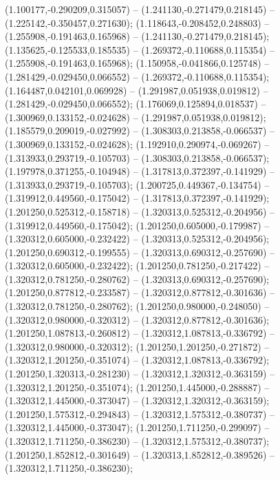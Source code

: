  (1.100177,-0.290209,0.315057) -- (1.241130,-0.271479,0.218145) -- (1.225142,-0.350457,0.271630);
 (1.118643,-0.208452,0.248803) -- (1.255908,-0.191463,0.165968) -- (1.241130,-0.271479,0.218145);
 (1.135625,-0.125533,0.185535) -- (1.269372,-0.110688,0.115354) -- (1.255908,-0.191463,0.165968);
 (1.150958,-0.041866,0.125748) -- (1.281429,-0.029450,0.066552) -- (1.269372,-0.110688,0.115354);
 (1.164487,0.042101,0.069928) -- (1.291987,0.051938,0.019812) -- (1.281429,-0.029450,0.066552);
 (1.176069,0.125894,0.018537) -- (1.300969,0.133152,-0.024628) -- (1.291987,0.051938,0.019812);
 (1.185579,0.209019,-0.027992) -- (1.308303,0.213858,-0.066537) -- (1.300969,0.133152,-0.024628);
 (1.192910,0.290974,-0.069267) -- (1.313933,0.293719,-0.105703) -- (1.308303,0.213858,-0.066537);
 (1.197978,0.371255,-0.104948) -- (1.317813,0.372397,-0.141929) -- (1.313933,0.293719,-0.105703);
 (1.200725,0.449367,-0.134754) -- (1.319912,0.449560,-0.175042) -- (1.317813,0.372397,-0.141929);
 (1.201250,0.525312,-0.158718) -- (1.320313,0.525312,-0.204956) -- (1.319912,0.449560,-0.175042);
 (1.201250,0.605000,-0.179987) -- (1.320312,0.605000,-0.232422) -- (1.320313,0.525312,-0.204956);
 (1.201250,0.690312,-0.199555) -- (1.320313,0.690312,-0.257690) -- (1.320312,0.605000,-0.232422);
 (1.201250,0.781250,-0.217422) -- (1.320312,0.781250,-0.280762) -- (1.320313,0.690312,-0.257690);
 (1.201250,0.877812,-0.233587) -- (1.320312,0.877812,-0.301636) -- (1.320312,0.781250,-0.280762);
 (1.201250,0.980000,-0.248050) -- (1.320312,0.980000,-0.320312) -- (1.320312,0.877812,-0.301636);
 (1.201250,1.087813,-0.260812) -- (1.320312,1.087813,-0.336792) -- (1.320312,0.980000,-0.320312);
 (1.201250,1.201250,-0.271872) -- (1.320312,1.201250,-0.351074) -- (1.320312,1.087813,-0.336792);
 (1.201250,1.320313,-0.281230) -- (1.320312,1.320312,-0.363159) -- (1.320312,1.201250,-0.351074);
 (1.201250,1.445000,-0.288887) -- (1.320312,1.445000,-0.373047) -- (1.320312,1.320312,-0.363159);
 (1.201250,1.575312,-0.294843) -- (1.320312,1.575312,-0.380737) -- (1.320312,1.445000,-0.373047);
 (1.201250,1.711250,-0.299097) -- (1.320312,1.711250,-0.386230) -- (1.320312,1.575312,-0.380737);
 (1.201250,1.852812,-0.301649) -- (1.320313,1.852812,-0.389526) -- (1.320312,1.711250,-0.386230);

